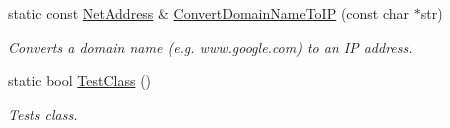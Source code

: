 \begin{DoxyCompactItemize}
static const \hyperlink{class_net_address}{NetAddress} \& \hyperlink{class_net_utility_a9a0239fd2f2e3f92f3fd68049c61d82f}{ConvertDomainNameToIP} (const char $\ast$str)
\begin{DoxyCompactList}\small\item\em Converts a domain name (e.g. www.google.com) to an IP address. \item\end{DoxyCompactList}\item 
static bool \hyperlink{class_net_utility_ae7a7c4737a2b25c8c856352b2052a9e1}{TestClass} ()
\begin{DoxyCompactList}\small\item\em Tests class. \item\end{DoxyCompactList}\end{DoxyCompactItemize}
